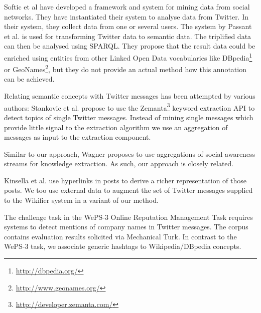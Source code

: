 \documentclass{llncs}
\begin{document}
Softic et al \cite{key:softic} have developed a framework and system for mining data from social networks. They have instantiated their system to analyse data from Twitter. In their system, they collect data from one or several users. The system by Passant et al. \cite{key:smob} is used for transforming Twitter data to semantic data. The triplified data can then be analysed using SPARQL. They propose that the result data could be enriched using entities from other Linked Open Data vocabularies like DBpedia\footnote{\url{http://dbpedia.org/}} or GeoNames\footnote{\url{http://www.geonames.org/}}, but they do not provide an actual method how this annotation can be achieved.

Relating semantic concepts with Twitter messages has been attempted by various authors:
Stankovic et al. \cite{key:stanko} propose to use the Zemanta\footnote{\url{http://developer.zemanta.com/}} keyword extraction API to detect topics of single Twitter messages. 
Instead of mining single messages which provide little signal to the extraction algorithm we use an aggregation of messages as input to the extraction component.

Similar to our approach, Wagner \cite{key:clauwa} proposes to use aggregations of social awareness streams for knowledge extraction. As such, our approach is closely related.

Kinsella et al. \cite{key:kinsella} use hyperlinks in posts to derive a richer representation of those posts. We too use external data to augment the set of Twitter messages supplied to the Wikifier system in a variant of our method.

The challenge task in the WePS-3 Online Reputation Management Task\cite{key:clef} requires systems to detect mentions of company names in Twitter messages.
The corpus contains evaluation results solicited via Mechanical Turk. In contrast to the WePS-3 task, we associate generic hashtags to Wikipedia/DBpedia concepts.
\end{document}

